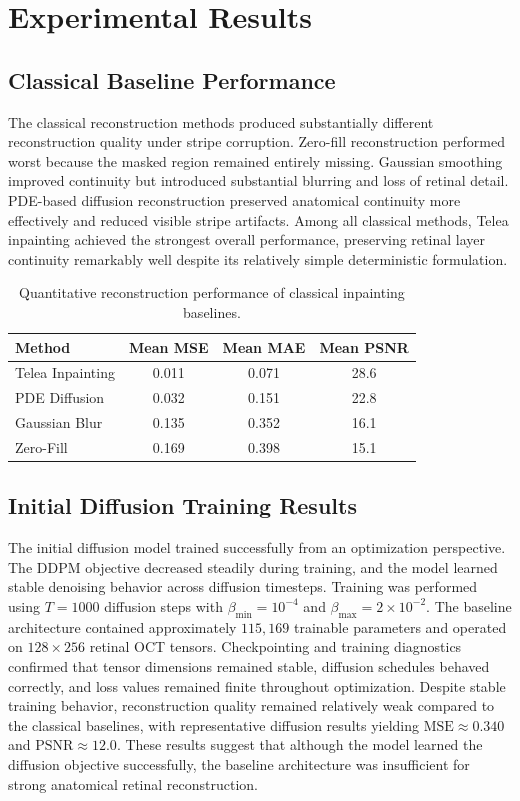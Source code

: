 \documentclass[12pt,oneside]{article}
\begin{document}
\section{Experimental Results}

\subsection*{Classical Baseline Performance}

The classical reconstruction methods produced substantially different reconstruction quality under stripe corruption. Zero-fill reconstruction performed worst because the masked region remained entirely missing. Gaussian smoothing improved continuity but introduced substantial blurring and loss of retinal detail. PDE-based diffusion reconstruction preserved anatomical continuity more effectively and reduced visible stripe artifacts. Among all classical methods, Telea inpainting achieved the strongest overall performance, preserving retinal layer continuity remarkably well despite its relatively simple deterministic formulation.

\begin{table}[H]
\centering
\begin{tabular}{lccc}
\toprule
Method & Mean MSE & Mean MAE & Mean PSNR \\
\midrule
Telea Inpainting & 0.011 & 0.071 & 28.6 \\
PDE Diffusion & 0.032 & 0.151 & 22.8 \\
Gaussian Blur & 0.135 & 0.352 & 16.1 \\
Zero-Fill & 0.169 & 0.398 & 15.1 \\
\bottomrule
\end{tabular}
\caption{Quantitative reconstruction performance of classical inpainting baselines.}
\end{table}
\subsection*{Initial Diffusion Training Results}

The initial diffusion model trained successfully from an optimization perspective. The DDPM objective decreased steadily during training, and the model learned stable denoising behavior across diffusion timesteps. Training was performed using \(T=1000\) diffusion steps with \(\beta_{\min}=10^{-4}\) and \(\beta_{\max}=2\times10^{-2}\). The baseline architecture contained approximately \(115{,}169\) trainable parameters and operated on \(128 \times 256\) retinal OCT tensors. Checkpointing and training diagnostics confirmed that tensor dimensions remained stable, diffusion schedules behaved correctly, and loss values remained finite throughout optimization. Despite stable training behavior, reconstruction quality remained relatively weak compared to the classical baselines, with representative diffusion results yielding \(\mathrm{MSE}\approx0.340\) and \(\mathrm{PSNR}\approx12.0\). These results suggest that although the model learned the diffusion objective successfully, the baseline architecture was insufficient for strong anatomical retinal reconstruction.
\end{document}
